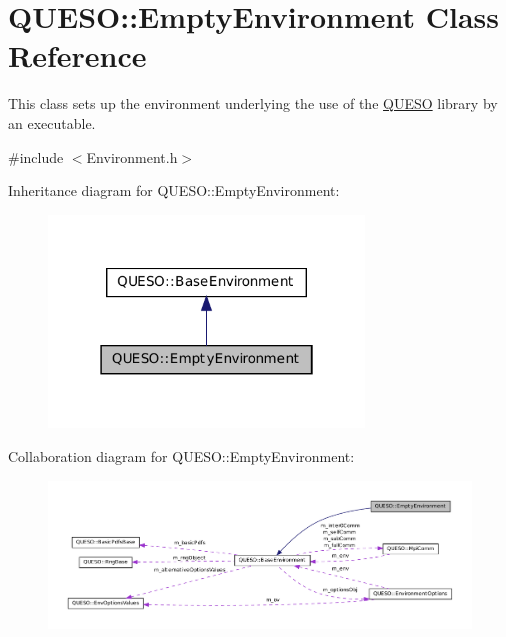 \hypertarget{class_q_u_e_s_o_1_1_empty_environment}{\section{Q\-U\-E\-S\-O\-:\-:Empty\-Environment Class Reference}
\label{class_q_u_e_s_o_1_1_empty_environment}
}


This class sets up the environment underlying the use of the \hyperlink{namespace_q_u_e_s_o}{Q\-U\-E\-S\-O} library by an executable.  




{\ttfamily \#include $<$Environment.\-h$>$}



Inheritance diagram for Q\-U\-E\-S\-O\-:\-:Empty\-Environment\-:
\nopagebreak
\begin{figure}[H]
\begin{center}
\leavevmode
\includegraphics[width=238pt]{class_q_u_e_s_o_1_1_empty_environment__inherit__graph}
\end{center}
\end{figure}


Collaboration diagram for Q\-U\-E\-S\-O\-:\-:Empty\-Environment\-:
\nopagebreak
\begin{figure}[H]
\begin{center}
\leavevmode
\includegraphics[width=350pt]{class_q_u_e_s_o_1_1_empty_environment__coll__graph}
\end{center}
\end{figure}
